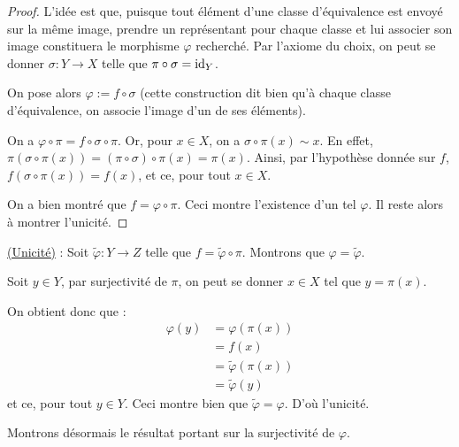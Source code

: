 \begin{proof}
  L'idée est que, puisque tout élément d'une classe d'équivalence est envoyé sur la même image, 
  prendre un représentant pour chaque classe et lui associer son image constituera le morphisme
  $\varphi$ recherché. 
  Par l'axiome du choix, on peut se donner $\sigma : Y \to X$ telle que $\pi \circ \sigma = \textup{id}_Y$.

  On pose alors $\varphi := f \circ \sigma$ (cette construction dit bien qu'à chaque classe 
  d'équivalence, on associe l'image d'un de ses éléments). 

  On a $\varphi \circ \pi = f \circ \sigma \circ \pi$. 
  Or, pour $x \in X$, on a $\sigma \circ\pi (x) \sim x$. 
  En effet, $\pi \left( \sigma \circ\pi (x) \right) = \left(\pi \circ \sigma\right) \circ\pi(x) =\pi (x)$. 
  Ainsi, par l'hypothèse donnée sur $f$, $f( \sigma \circ\pi (x)) = f(x)$, et ce, pour tout $x \in X$.

  On a bien montré que $f = \varphi \circ\pi$.
  Ceci montre l'existence d'un tel $\varphi$. Il reste alors à montrer l'unicité.

\end{proof}

\begin{proofr}
  \underline{(Unicité)} : 
    Soit $\tilde{\varphi} : Y \to Z$ telle que $f = \tilde{\varphi} \circ \pi $. 
    Montrons que $\varphi = \tilde{\varphi}$.
    
    Soit $y \in Y$, par surjectivité de $\pi $, on peut se donner $x \in X$ tel que $y = \pi (x)$.

    On obtient donc que : 
    \begin{align*}
      \varphi(y)  &= \varphi(\pi (x)) \\
                  &= f(x) \\
                  &= \tilde{\varphi}(\pi (x)) \\
                  &= \tilde{\varphi}(y) 
    \end{align*}
    et ce, pour tout $y \in Y$. Ceci montre bien que $\tilde{\varphi} = \varphi$.
        D'où l'unicité.

\end{proofr}

\begin{proofe}
    
\end{proofe}
  \begin{proofe}
  Montrons désormais le résultat portant sur la surjectivité de $\varphi$.
  \end{proofe}
  
